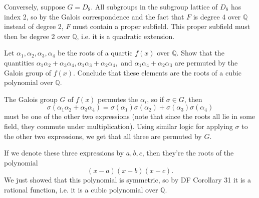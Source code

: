 \documentclass[10pt]{report}
\begin{document}
Conversely, suppose $ G=D_8$. All subgroups in the subgroup lattice of $D_8$ has index 2, so by the Galois correspondence and the fact that $F$ is degree 4 over $\mathbb{Q}$ instead of degree 2, $F$ must contain a proper subfield. This proper subfield must then be degree 2 over $\mathbb{Q}$, i.e. it is a quadratic extension.

\pagebreak
\begin{exer}[14.6: 44]
	Let $\alpha_1,\alpha_2,\alpha_3,\alpha_4$ be the roots of a quartic $f(x)$ over $\mathbb{Q}$. Show that the quantities $\alpha_1\alpha_2+\alpha_3\alpha_4, \alpha_1\alpha_3+\alpha_2\alpha_4,$ and $\alpha_1\alpha_4+\alpha_2\alpha_3$ are permuted by the Galois group of $f(x)$. Conclude that these elements are the roots of a cubic polynomial over $\mathbb{Q}$.
\end{exer}
The Galois group $G$ of $f(x)$ permutes the $\alpha_i$, so if $\sigma \in G$, then
\[
	\sigma(\alpha_1 \alpha_2+\alpha_3\alpha_4) = \sigma(\alpha_1)\sigma(\alpha_2)+\sigma(\alpha_3)\sigma(\alpha_4)
\] must be one of the other two expressions (note that since the roots all lie in some field, they commute under multiplication). Using similar logic for applying $\sigma$ to the other two expressions, we get that all three are permuted by $G$.

If we denote these three expressions by $a,b,c$, then they're the roots of the polynomial
\[
	(x-a)(x-b)(x-c).
\] We just showed that this polynomial is symmetric, so by DF Corollary 31 it is a rational function, i.e. it is a cubic polynomial over $\mathbb{Q}$.
\end{document}
